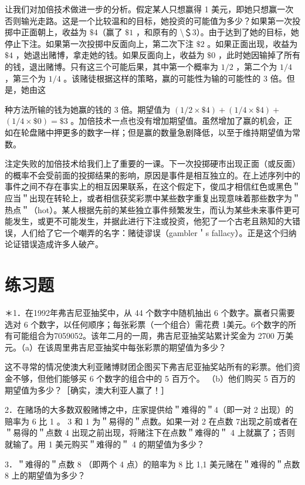 让我们对加倍技术做进一步的分析。假定某人只想赢得 1 美元，即她只想赢一次否则输光走路。这是一个比较温和的目标，她投资的可能值为多少？如果第一次投掷中正面朝上，收益为 $\$ 4$（赢了 $\$ 1$ ，和原有的 \textbackslash ＄3）。由于达到了她的目标，她停止下注。如果第一次投掷中反面向上，第二次下注 $\$ 2$ 。如果正面出现，收益为 $\$ 4$ ，她退出赌博，拿走她的钱。如果反面向上，收益为 $\$ 0$ ，此时她因输掉了所有的钱，退出赌博。只有这三个可能后果，其中第一个概率为 $1 / 2$ ，第二个为 $1 / 4$ ，第三个为 $1 / 4$ 。该赌徒根据这样的策略，赢的可能性为输的可能性的 3 倍。但是，她由这

种方法所输的钱为她赢的钱的 3 倍。期望值为 $(1 / 2 \times \$ 4)+(1 / 4 \times \$ 4)+$ $(1 / 4 \times \$ 0)=\$ 3$ 。加倍技术一点也没有增加期望值。虽然增加了赢的机会，正如在轮盘赌中押更多的数字一样；但是赢的数量急剧降低，以至于维持期望值为常数。

注定失败的加倍技术给我们上了重要的一课。下一次投掷硬市出现正面（或反面）的概率不会受前面的投掷结果的影响，原因是事件是相互独立的。在上述序列中的事件之间不存在事实上的相互因果联系，在这个假定下，俊瓜才相信红色或黑色＂应当＂出现在转轮上，或者相信获奖彩票中某些数字重复出现意味着那些数字为＂热点＂（hot）。某人根据先前的某些独立事件频繁发生，而认为某些未来事件更可能发生，或更不可能发生，并据此进行下注或投资，他犯了一个古老且熟知的大错误，人们给了它一个嘲弄的名字：赌徒谬误（gambler＇s fallacy）。正是这个归纳论证错误造成许多人破产。

\section*{练习题}
＊1．在1992年弗吉尼亚抽奖中，从 44 个数字中随机抽出 6 个数字。赢者只需要选对 6 个数字，以任何顺序；每张彩票（一个组合）需花费 1美元。6个数字的所有可能组合为7059052。该年二月的一周，弗吉尼亚抽奖站累计奖金为 2700 万美元。（a）在该周里弗吉尼亚抽奖中每张彩票的期望值为多少？

这不寻常的情况使澳大利亚赌博财团企图买下弗吉尼亚抽奖站所有的彩票。他们资金不够，但他们能够买 6 个数字的组合中的 5 百万个。 （b）他们购买 5 百万的期望值为多少？［确实，澳大利亚人赢了！］

2．在赌场的大多数双骰赌博之中，庄家提供给＂难得的＂4（即一对 2 出现）的赔率为 6 比 1 。 3 和 1 为＂易得的＂点数。如果一对 2 在点数 7出现之前或者在＂易得的＂点数 4 出现之前出现，将赌注下在点数＂难得的＂ 4 上就赢了；否则就输了。用 1 美元购买＂难得的＂ 4 的期望值为多少？

3．＂难得的＂点数 8 （即两个 4 点）的赔率为 8 比 1,1 美元赌在＂难得的＂点数 8 上的期望值为多少？

